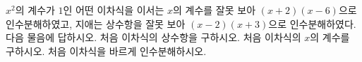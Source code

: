 $x^2$의 계수가 $1$인 어떤 이차식을 이서는 $x$의 계수를 잘못 보아 $(x+2)(x-6)$으로 인수분해하였고, 지애는 상수항을 잘못 보아 $(x-2)(x+3)$으로 인수분해하였다. 다음 물음에 답하시오.
 처음 이차식의 상수항을 구하시오.
 처음 이차식의 $x$의 계수를 구하시오.
 처음 이차식을 바르게 인수분해하시오.
